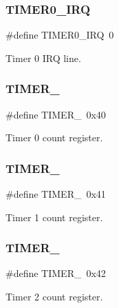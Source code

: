 \subsubsection{\texorpdfstring{T\+I\+M\+E\+R0\+\_\+\+I\+RQ}{TIMER0\_IRQ}}
{\footnotesize\ttfamily \#define T\+I\+M\+E\+R0\+\_\+\+I\+RQ~0}



Timer 0 I\+RQ line. 

\hypertarget{group__i8254_gacc9ff9df4a9674a1ce9ba08fc4a4679e}{}\label{group__i8254_gacc9ff9df4a9674a1ce9ba08fc4a4679e} 
\subsubsection{\texorpdfstring{T\+I\+M\+E\+R\+\_}{TIMER\_0}}
{\footnotesize\ttfamily \#define T\+I\+M\+E\+R\+\_~0x40}



Timer 0 count register. 

\hypertarget{group__i8254_gac62c99c2a9289891c1b83052242cca49}{}\label{group__i8254_gac62c99c2a9289891c1b83052242cca49} 
\subsubsection{\texorpdfstring{T\+I\+M\+E\+R\+\_}{TIMER\_1}}
{\footnotesize\ttfamily \#define T\+I\+M\+E\+R\+\_~0x41}



Timer 1 count register. 

\hypertarget{group__i8254_ga1f34f18ad0ab8cace46b615773b48735}{}\label{group__i8254_ga1f34f18ad0ab8cace46b615773b48735} 
\subsubsection{\texorpdfstring{T\+I\+M\+E\+R\+\_}{TIMER\_2}}
{\footnotesize\ttfamily \#define T\+I\+M\+E\+R\+\_~0x42}



Timer 2 count register. 

\hypertarget{group__i8254_ga325b992a371d5d981c4eceff42fa5956}{}\label{group__i8254_ga325b992a371d5d981c4eceff42fa5956} 
